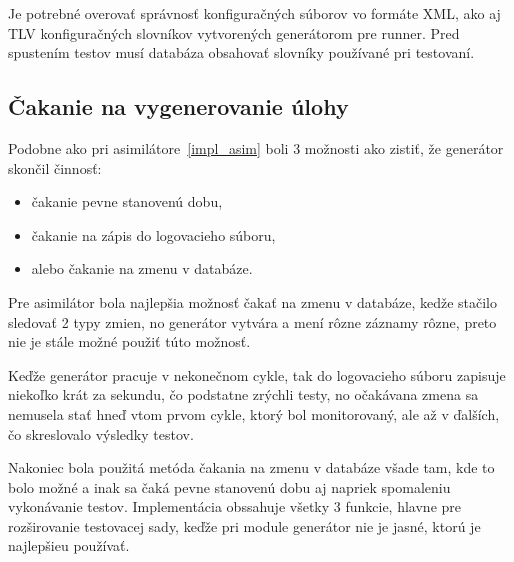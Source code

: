 Je potrebné overovať správnosť konfiguračných súborov vo formáte XML, ako aj TLV konfiguračných slovníkov vytvorených generátorom pre runner. Pred spustením testov musí databáza obsahovať slovníky používané pri testovaní.

\subsection*{Čakanie na vygenerovanie úlohy}
Podobne ako pri asimilátore~\ref{impl_asim} boli 3 možnosti ako zistiť, že generátor skončil činnosť:
\begin{itemize}
	\item čakanie pevne stanovenú dobu,
	\item čakanie na zápis do logovacieho súboru, 
	\item alebo čakanie na zmenu v databáze.
\end{itemize}
Pre asimilátor bola najlepšia možnosť čakať na zmenu v databáze, kedže stačilo sledovať 2 typy zmien, no generátor vytvára a mení rôzne záznamy rôzne, preto nie je stále možné použiť túto možnosť.

Keďže generátor pracuje v nekonečnom cykle, tak do logovacieho súboru zapisuje niekoľko krát za sekundu, čo podstatne zrýchli testy, no očakávana zmena sa nemusela stať hneď vtom prvom cykle, ktorý bol monitorovaný, ale až v ďalších, čo skreslovalo výsledky testov.

Nakoniec bola použitá metóda čakania na zmenu v databáze všade tam, kde to bolo možné a inak sa čaká pevne stanovenú dobu aj napriek spomaleniu vykonávanie testov.
Implementácia obssahuje všetky 3 funkcie, hlavne pre rozširovanie testovacej sady, keďže pri module generátor nie je jasné, ktorú je najlepšieu používať.

